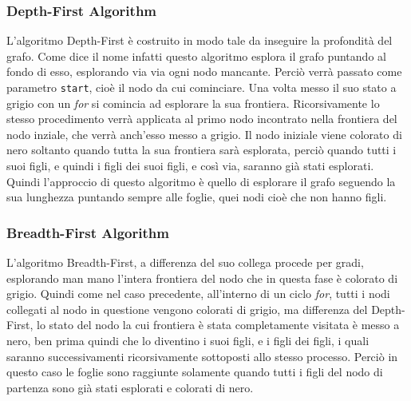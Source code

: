 \documentclass{article}
\begin{document}
\subsubsection{Depth-First Algorithm}
L'algoritmo Depth-First \`e costruito in modo tale da inseguire la profondit\`a del grafo. Come dice il nome infatti questo algoritmo esplora il grafo puntando al fondo di esso, esplorando via via ogni nodo mancante. \newline
Perci\`o verr\`a passato come parametro \texttt{start}, cio\`e il nodo da cui cominciare. Una volta messo il suo stato a grigio con un \textit{for} si comincia ad esplorare la sua frontiera. Ricorsivamente lo stesso procedimento verr\`a applicata al primo nodo incontrato nella frontiera del nodo inziale, che verr\`a anch'esso messo a grigio. \newline
Il nodo iniziale viene colorato di nero soltanto quando tutta la sua frontiera sar\`a esplorata, perci\`o quando tutti i suoi figli, e quindi i figli dei suoi figli, e cos\`i via, saranno gi\`a stati esplorati.\newline
Quindi l'approccio di questo algoritmo \`e quello di esplorare il grafo seguendo la sua lunghezza puntando sempre alle foglie, quei nodi cio\`e che non hanno figli.

\subsubsection{Breadth-First Algorithm}
L'algoritmo Breadth-First, a differenza del suo collega procede per gradi, esplorando man mano l'intera frontiera del nodo che in questa fase \`e colorato di grigio. \newline
Quindi come nel caso precedente, all'interno di un ciclo \textit{for}, tutti i nodi collegati al nodo in questione vengono colorati di grigio, ma differenza del Depth-First, lo stato del nodo la cui frontiera \`e stata completamente visitata \`e messo a nero, ben prima quindi che lo diventino i suoi figli, e i figli dei figli, i quali saranno successivamenti ricorsivamente sottoposti allo stesso processo.\newline
Perci\`o in questo caso le foglie sono raggiunte solamente quando tutti i figli del nodo di partenza sono gi\`a stati esplorati e colorati di nero.
\end{document}
